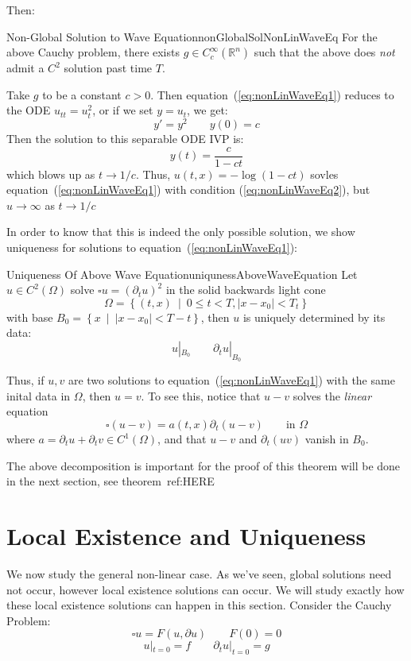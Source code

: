 \documentclass{book}
\newenvironment{Proof}[1][]
  {\begin{ProofTcb}[#1]}
  {\end{ProofTcb}}
\newcommand{\R}{{\mathbb{R}}}
\newcommand{\rw}{\rightarrow}
\newcommand{\set}[2]{\left\{#1 \ \middle|\ #2\right\}}
\begin{document}
Then:
\begin{thm}{Non-Global Solution to Wave Equation}{nonGlobalSolNonLinWaveEq}
	For the above Cauchy problem, there exists $g \in C_c^\infty(\R^n)$ such that the above does \emph{not} admit
	a $C^2$ solution past time $T$.
\end{thm}

\begin{Proof}
	Take $g$ to be a constant $c > 0$. Then equation~(\ref{eq:nonLinWaveEq1}) reduces to the ODE $u_{tt} =u_{t}^2$, or
	if we set $y  =u_t$, we get:
	\[
		y' = y^2 \qquad y(0) = c
	\]
	Then the solution to this separable ODE IVP is:
	\[
		y(t) = \frac{c}{1-ct}
	\]
	which blows up as $t \rw 1/c$. Thus, $u(t,x) = -\log(1-ct)$ sovles equation~(\ref{eq:nonLinWaveEq1}) with condition
	(\ref{eq:nonLinWaveEq2}), but $u \rw \infty$ as $ t \rw 1/c$
\end{Proof}

In order to know that this is indeed the only possible solution, we show uniqueness for solutions to
equation~(\ref{eq:nonLinWaveEq1}):

\begin{thm}{Uniqueness Of Above Wave Equation}{uniqunessAboveWaveEquation}
	Let $u \in C^2(\Omega)$ solve $\square u = (  \partial_t u )^2$ in the solid backwards light cone
	\[
		\Omega = \set{(t,x)}{0 \le t < T, |x - x_0| < T_t}
	\]
	with base $B_0  =\set{x}{|x - x_0| < T-t}$, then $u$ is uniquely determined by its data:
	\[
		u|_{B_0} \qquad  \partial_t u|_{B_0}
	\]
\end{thm}
Thus, if $u,v$ are two solutions to equation~(\ref{eq:nonLinWaveEq1}) with the same inital data in $\Omega$, then $u
= v$. To see this, notice that $u-v$ solves the \emph{linear} equation
\[
	\square (u-v) = a(t,x)  \partial_t (u-v) \qquad \text{in $\Omega$}
\]
where $a =  \partial_t u +  \partial_t v \in C^1(\Omega)$, and that $u-v$ and $\partial_t(uv)$ vanish in $B_0$.

\begin{Proof}
	The above decomposition is important for the proof of this theorem will be done in the next section, see theorem~ref:HERE
\end{Proof}


\section{Local Existence and Uniqueness}

We now study the general non-linear case. As we've seen, global solutions need not occur, however local existence
solutions can occur. We will study exactly how these local existence solutions can happen in this section. Consider the
Cauchy Problem:
\begin{equation}\label{eq:nonLinCauchyProb1}
  \square u = F(u,  \partial u) \qquad F(0) = 0
\end{equation}
\begin{equation}\label{eq:nonLinCauchyProb2}
	u|_{t=0} = f \qquad  \partial_t u|_{t=0} = g
\end{equation}
\end{document}
